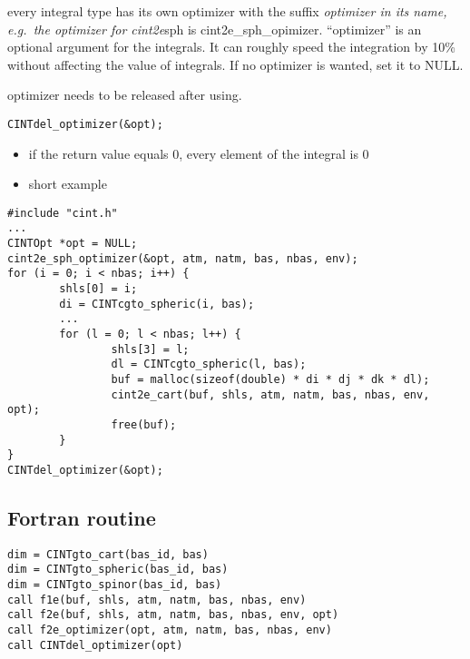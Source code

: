 \documentclass[]{article}
\begin{document}
every integral type has its own optimizer with the suffix
\emph{optimizer in its name, e.g.~the optimizer for cint2e}sph is
cint2e\_sph\_opimizer. ``optimizer'' is an optional argument for the
integrals. It can roughly speed the integration by 10\% without
affecting the value of integrals. If no optimizer is wanted, set it to
NULL.

optimizer needs to be released after using.

\begin{verbatim}
CINTdel_optimizer(&opt);
\end{verbatim}

\begin{itemize}
\item
  if the return value equals 0, every element of the integral is 0
\item
  short example
\end{itemize}

\begin{verbatim}
#include "cint.h"
...
CINTOpt *opt = NULL;
cint2e_sph_optimizer(&opt, atm, natm, bas, nbas, env);
for (i = 0; i < nbas; i++) {
        shls[0] = i;
        di = CINTcgto_spheric(i, bas);
        ...
        for (l = 0; l < nbas; l++) {
                shls[3] = l;
                dl = CINTcgto_spheric(l, bas);
                buf = malloc(sizeof(double) * di * dj * dk * dl);
                cint2e_cart(buf, shls, atm, natm, bas, nbas, env, opt);
                free(buf);
        }
}
CINTdel_optimizer(&opt);
\end{verbatim}

\subsection{Fortran routine}\label{fortran-routine}

\begin{verbatim}
dim = CINTgto_cart(bas_id, bas)
dim = CINTgto_spheric(bas_id, bas)
dim = CINTgto_spinor(bas_id, bas)
call f1e(buf, shls, atm, natm, bas, nbas, env)
call f2e(buf, shls, atm, natm, bas, nbas, env, opt)
call f2e_optimizer(opt, atm, natm, bas, nbas, env)
call CINTdel_optimizer(opt)
\end{verbatim}
\end{document}
